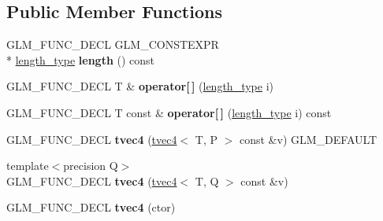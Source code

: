 \subsection*{Public Member Functions}
\begin{DoxyCompactItemize}
\item 
\hypertarget{structglm_1_1tvec4_ae738a88358347f5a224265f2caef2112}{G\-L\-M\-\_\-\-F\-U\-N\-C\-\_\-\-D\-E\-C\-L G\-L\-M\-\_\-\-C\-O\-N\-S\-T\-E\-X\-P\-R \\*
\hyperlink{structglm_1_1tvec4_a4e2b34a427cac7e72b6f73173c206feb}{length\-\_\-type} {\bfseries length} () const }\label{structglm_1_1tvec4_ae738a88358347f5a224265f2caef2112}

\item 
\hypertarget{structglm_1_1tvec4_a036a73844fb59380b1149744e1ddd2b2}{G\-L\-M\-\_\-\-F\-U\-N\-C\-\_\-\-D\-E\-C\-L T \& {\bfseries operator\mbox{[}$\,$\mbox{]}} (\hyperlink{structglm_1_1tvec4_a4e2b34a427cac7e72b6f73173c206feb}{length\-\_\-type} i)}\label{structglm_1_1tvec4_a036a73844fb59380b1149744e1ddd2b2}

\item 
\hypertarget{structglm_1_1tvec4_a5bb34b89cb6d008556484ebd13b54b80}{G\-L\-M\-\_\-\-F\-U\-N\-C\-\_\-\-D\-E\-C\-L T const \& {\bfseries operator\mbox{[}$\,$\mbox{]}} (\hyperlink{structglm_1_1tvec4_a4e2b34a427cac7e72b6f73173c206feb}{length\-\_\-type} i) const }\label{structglm_1_1tvec4_a5bb34b89cb6d008556484ebd13b54b80}

\item 
\hypertarget{structglm_1_1tvec4_a83021ec577e34e554efcf4471c067083}{G\-L\-M\-\_\-\-F\-U\-N\-C\-\_\-\-D\-E\-C\-L {\bfseries tvec4} (\hyperlink{structglm_1_1tvec4}{tvec4}$<$ T, P $>$ const \&v) G\-L\-M\-\_\-\-D\-E\-F\-A\-U\-L\-T}\label{structglm_1_1tvec4_a83021ec577e34e554efcf4471c067083}

\item 
\hypertarget{structglm_1_1tvec4_af7f49516a64422ac3ec7856a7ee53efb}{{\footnotesize template$<$precision Q$>$ }\\G\-L\-M\-\_\-\-F\-U\-N\-C\-\_\-\-D\-E\-C\-L {\bfseries tvec4} (\hyperlink{structglm_1_1tvec4}{tvec4}$<$ T, Q $>$ const \&v)}\label{structglm_1_1tvec4_af7f49516a64422ac3ec7856a7ee53efb}

\item 
\hypertarget{structglm_1_1tvec4_a4ea8520b740b5afaff507da91d0270dc}{G\-L\-M\-\_\-\-F\-U\-N\-C\-\_\-\-D\-E\-C\-L {\bfseries tvec4} (ctor)}\label{structglm_1_1tvec4_a4ea8520b740b5afaff507da91d0270dc}


\end{DoxyCompactItemize}
